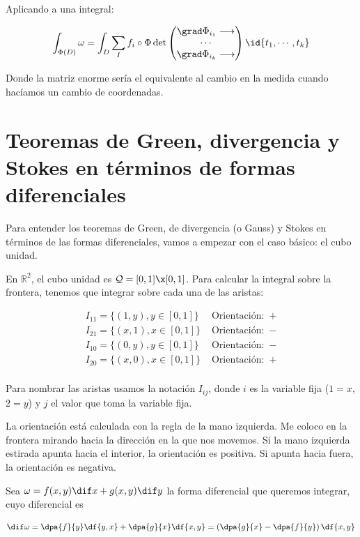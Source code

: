 Aplicando a una integral:

\begin{equation}
\int_{\Phi(D)} \omega = \int_D \sum_I f_i\circ\Phi
\det \begin{pmatrix}
	\grad \Phi_{i_1} \longrightarrow \\
	\cdots\\
	\grad \Phi_{i_k} \longrightarrow
\end{pmatrix}\id{t_1,\dotsb,t_k}
\label{eqPbIntFDif}
\end{equation}

Donde la matriz enorme sería el equivalente al cambio en la medida cuando hacíamos un cambio de coordenadas.

\section{Teoremas de Green, divergencia y Stokes en términos de formas diferenciales}
Para entender los teoremas de Green, de divergencia (o Gauss) y Stokes en términos de las formas diferenciales, vamos a empezar con el caso básico: el cubo unidad.

En $ℝ^2$, el cubo unidad es $\mathcal{Q} = [0,1]\x[0,1]$. Para calcular la integral sobre la frontera, tenemos que integrar sobre cada una de las aristas:

\[\begin{array}{cc}
I_{11} =\{(1,y),y\in[0,1]\}&\text{ Orientación: }\, +\\
I_{21} =\{(x,1),x\in[0,1]\}&\text{ Orientación: }\, -\\
I_{10} =\{(0,y),y\in[0,1]\}&\text{ Orientación: }\, -\\
I_{20} =\{(x,0),x\in[0,1]\}&\text{ Orientación: }\, +\\
\end{array}
\]

Para nombrar las aristas usamos la notación $I_{ij}$, donde $i$ es la variable fija ($1=x$,$2=y$) y $j$ el valor que toma la variable fija.

La orientación está calculada con la regla de la mano izquierda. Me coloco en la frontera mirando hacia la dirección en la que nos movemos. Si la mano izquierda estirada apunta hacia el interior, la orientación es positiva. Si apunta hacia fuera, la orientación es negativa.

Sea $\omega = f(x,y)\dif x + g(x,y)\dif y$ la forma diferencial que queremos integrar, cuyo diferencial es

\[\dif \omega= \dpa{f}{y}\df{y,x} + \dpa{g}{x}\df{x,y} = \left(\dpa{g}{x} - \dpa{f}{y}\right) \df{x,y}\]

